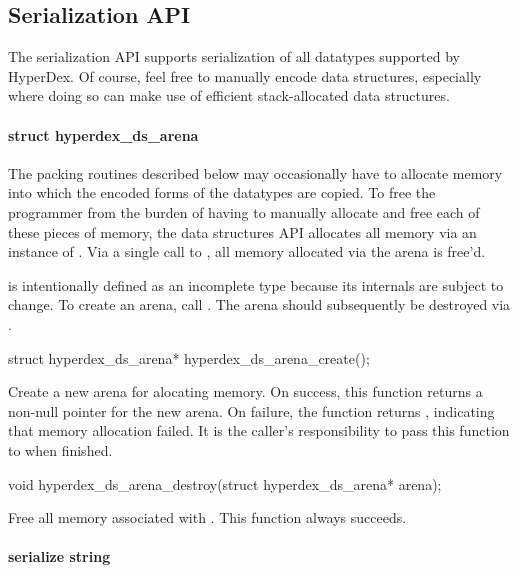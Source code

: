 \subsection{Serialization API}
\label{sec:api:c:client:serialize}

The serialization API supports serialization of all datatypes supported by
HyperDex.  Of course, feel free to manually encode data structures, especially
where doing so can make use of efficient stack-allocated data structures.

\paragraph{struct hyperdex\_ds\_arena}

The packing routines described below may occasionally have to allocate memory
into which the encoded forms of the datatypes are copied.  To free the
programmer from the burden of having to manually allocate and free each of these
pieces of memory, the data structures API allocates all memory via an instance
of .  Via a single call to
, all memory allocated via the arena is
free'd.

 is intentionally defined as an incomplete type
because its internals are subject to change.  To create an arena, call
.  The arena should subsequently be destroyed
via .

\begin{ccode}
struct hyperdex_ds_arena* hyperdex_ds_arena_create();
\end{ccode}
Create a new arena for alocating memory.  On success, this function
returns a non-null pointer for the new arena.  On failure, the function returns
, indicating that memory allocation failed.  It is the caller's
responsibility to pass this function to  when
finished.

\begin{ccode}
void hyperdex_ds_arena_destroy(struct hyperdex_ds_arena* arena);
\end{ccode}
Free all memory associated with .  This function always
succeeds.

\paragraph{serialize string}


